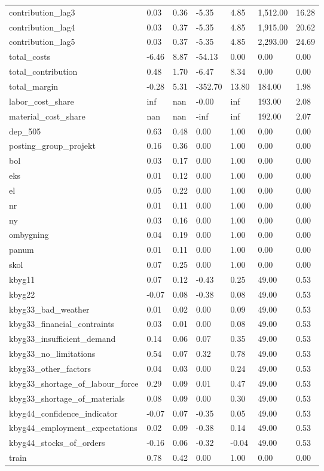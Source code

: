 \begin{landscape}
\begin{longtable}[h!]{lllllll}
contribution_lag3 & 0.03 & 0.36 & -5.35 & 4.85 & 1,512.00 & 16.28 \\
contribution_lag4 & 0.03 & 0.37 & -5.35 & 4.85 & 1,915.00 & 20.62 \\
contribution_lag5 & 0.03 & 0.37 & -5.35 & 4.85 & 2,293.00 & 24.69 \\
total_costs & -6.46 & 8.87 & -54.13 & 0.00 & 0.00 & 0.00 \\
total_contribution & 0.48 & 1.70 & -6.47 & 8.34 & 0.00 & 0.00 \\
total_margin & -0.28 & 5.31 & -352.70 & 13.80 & 184.00 & 1.98 \\
labor_cost_share & inf & nan & -0.00 & inf & 193.00 & 2.08 \\
material_cost_share & nan & nan & -inf & inf & 192.00 & 2.07 \\
dep_505 & 0.63 & 0.48 & 0.00 & 1.00 & 0.00 & 0.00 \\
posting_group_projekt & 0.16 & 0.36 & 0.00 & 1.00 & 0.00 & 0.00 \\
bol & 0.03 & 0.17 & 0.00 & 1.00 & 0.00 & 0.00 \\
eks & 0.01 & 0.12 & 0.00 & 1.00 & 0.00 & 0.00 \\
el & 0.05 & 0.22 & 0.00 & 1.00 & 0.00 & 0.00 \\
nr & 0.01 & 0.11 & 0.00 & 1.00 & 0.00 & 0.00 \\
ny & 0.03 & 0.16 & 0.00 & 1.00 & 0.00 & 0.00 \\
ombygning & 0.04 & 0.19 & 0.00 & 1.00 & 0.00 & 0.00 \\
panum & 0.01 & 0.11 & 0.00 & 1.00 & 0.00 & 0.00 \\
skol & 0.07 & 0.25 & 0.00 & 1.00 & 0.00 & 0.00 \\
kbyg11 & 0.07 & 0.12 & -0.43 & 0.25 & 49.00 & 0.53 \\
kbyg22 & -0.07 & 0.08 & -0.38 & 0.08 & 49.00 & 0.53 \\
kbyg33_bad_weather & 0.01 & 0.02 & 0.00 & 0.09 & 49.00 & 0.53 \\
kbyg33_financial_contraints & 0.03 & 0.01 & 0.00 & 0.08 & 49.00 & 0.53 \\
kbyg33_insufficient_demand & 0.14 & 0.06 & 0.07 & 0.35 & 49.00 & 0.53 \\
kbyg33_no_limitations & 0.54 & 0.07 & 0.32 & 0.78 & 49.00 & 0.53 \\
kbyg33_other_factors & 0.04 & 0.03 & 0.00 & 0.24 & 49.00 & 0.53 \\
kbyg33_shortage_of_labour_force & 0.29 & 0.09 & 0.01 & 0.47 & 49.00 & 0.53 \\
kbyg33_shortage_of_materials & 0.08 & 0.09 & 0.00 & 0.30 & 49.00 & 0.53 \\
kbyg44_confidence_indicator & -0.07 & 0.07 & -0.35 & 0.05 & 49.00 & 0.53 \\
kbyg44_employment_expectations & 0.02 & 0.09 & -0.38 & 0.14 & 49.00 & 0.53 \\
kbyg44_stocks_of_orders & -0.16 & 0.06 & -0.32 & -0.04 & 49.00 & 0.53 \\
train & 0.78 & 0.42 & 0.00 & 1.00 & 0.00 & 0.00 \\
\end{longtable}\end{landscape}
